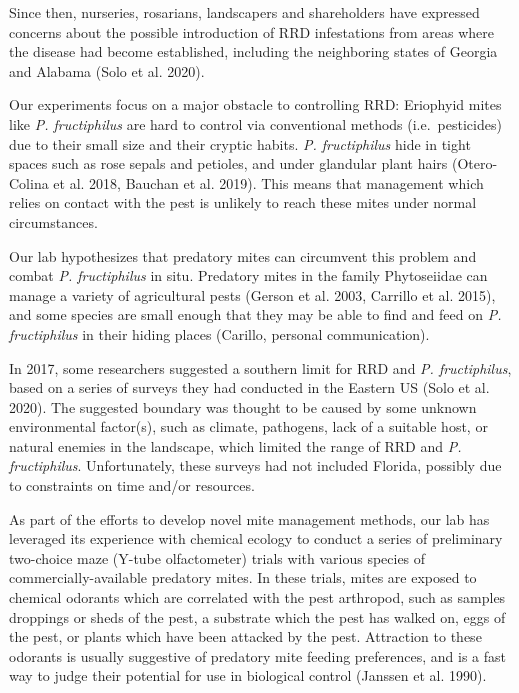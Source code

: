 \documentclass[12pt,final,CPage]{ufthesis}
\begin{document}
{  Since then, nurseries, rosarians, landscapers and shareholders have expressed concerns about the possible introduction of RRD infestations from areas where the disease had become established, including the neighboring states of Georgia and Alabama (Solo et al. 2020).

  Our experiments focus on a major obstacle to controlling RRD: Eriophyid mites like \emph{P. fructiphilus} are hard to control via conventional methods (i.e.~pesticides) due to their small size and their cryptic habits. \emph{P. fructiphilus} hide in tight spaces such as rose sepals and petioles, and under glandular plant hairs (Otero-Colina et al. 2018, Bauchan et al. 2019). This means that management which relies on contact with the pest is unlikely to reach these mites under normal circumstances.

  Our lab hypothesizes that predatory mites can circumvent this problem and combat \emph{P. fructiphilus} in situ. Predatory mites in the family Phytoseiidae can manage a variety of agricultural pests (Gerson et al. 2003, Carrillo et al. 2015), and some species are small enough that they may be able to find and feed on \emph{P. fructiphilus} in their hiding places (Carillo, personal communication).

  In 2017, some researchers suggested a southern limit for RRD and \emph{P. fructiphilus}, based on a series of surveys they had conducted in the Eastern US (Solo et al. 2020). The suggested boundary was thought to be caused by some unknown environmental factor(s), such as climate, pathogens, lack of a suitable host, or natural enemies in the landscape, which limited the range of RRD and \emph{P. fructiphilus}. Unfortunately, these surveys had not included Florida, possibly due to constraints on time and/or resources.

  As part of the efforts to develop novel mite management methods, our lab has leveraged its experience with chemical ecology to conduct a series of preliminary two-choice maze (Y-tube olfactometer) trials with various species of commercially-available predatory mites. In these trials, mites are exposed to chemical odorants which are correlated with the pest arthropod, such as samples droppings or sheds of the pest, a substrate which the pest has walked on, eggs of the pest, or plants which have been attacked by the pest. Attraction to these odorants is usually suggestive of predatory mite feeding preferences, and is a fast way to judge their potential for use in biological control (Janssen et al. 1990).

}
\end{document}
